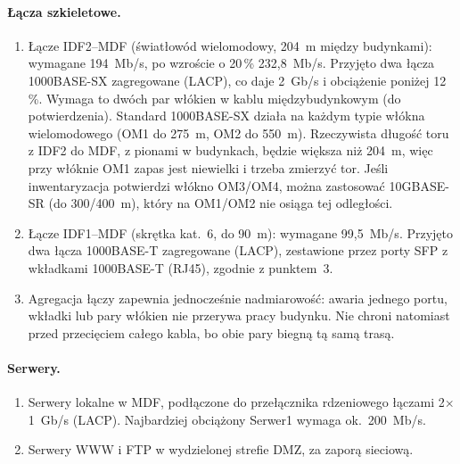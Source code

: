 \documentclass[12pt,a4paper]{article}
\begin{document}
\paragraph{Łącza szkieletowe.}
\begin{enumerate}[resume]
  \item Łącze IDF2--MDF (światłowód wielomodowy, 204~m między budynkami):
  wymagane 194~Mb/s, po wzroście o 20\,\% 232,8~Mb/s. Przyjęto dwa łącza
  1000BASE-SX zagregowane (LACP), co daje 2~Gb/s i obciążenie poniżej
  12\,\%. Wymaga to dwóch par włókien w kablu międzybudynkowym (do
  potwierdzenia). Standard 1000BASE-SX działa na każdym typie włókna
  wielomodowego (OM1 do 275~m, OM2 do 550~m). Rzeczywista długość toru
  z IDF2 do MDF, z pionami w budynkach, będzie większa niż 204~m, więc przy
  włóknie OM1 zapas jest niewielki i trzeba zmierzyć tor. Jeśli inwentaryzacja
  potwierdzi włókno OM3/OM4, można zastosować 10GBASE-SR (do 300/400~m), który
  na OM1/OM2 nie osiąga tej odległości.
  \item Łącze IDF1--MDF (skrętka kat.~6, do 90~m): wymagane 99,5~Mb/s.
  Przyjęto dwa łącza 1000BASE-T zagregowane (LACP), zestawione przez porty
  SFP z wkładkami 1000BASE-T (RJ45), zgodnie z punktem~3.
  \item Agregacja łączy zapewnia jednocześnie nadmiarowość: awaria jednego
  portu, wkładki lub pary włókien nie przerywa pracy budynku. Nie chroni
  natomiast przed przecięciem całego kabla, bo obie pary biegną tą samą trasą.
\end{enumerate}

\paragraph{Serwery.}
\begin{enumerate}[resume]
  \item Serwery lokalne w MDF, podłączone do przełącznika rdzeniowego
  łączami 2$\times$1~Gb/s (LACP). Najbardziej obciążony Serwer1 wymaga
  ok.\ 200~Mb/s.
  \item Serwery WWW i FTP w wydzielonej strefie DMZ, za zaporą sieciową.
\end{enumerate}
\end{document}
